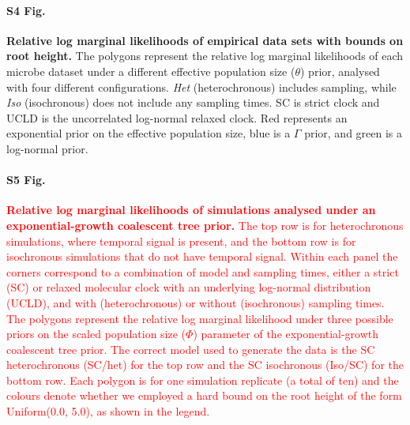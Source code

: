 \documentclass[10pt,letterpaper]{article}
\begin{document}
\paragraph*{S4 Fig.}
\label{S4_Fig}
	\textbf{Relative log marginal likelihoods of empirical data sets with bounds on root height.} The polygons represent the relative log marginal likelihoods of each microbe dataset under a different effective population size ($\theta$) prior, analysed with four different configurations. \textit{Het} (heterochronous) includes sampling, while \textit{Iso} (isochronous) does not include any sampling times. SC is strict clock and UCLD is the uncorrelated log-normal relaxed clock. Red represents an exponential prior on the effective population size, blue is a $\Gamma$ prior, and green is a log-normal prior.

\paragraph*{S5 Fig.}
\label{S5_Fig}
	\textcolor{red}{\textbf{Relative log marginal likelihoods of simulations analysed under an exponential-growth coalescent tree prior.} The top row is for heterochronous simulations, where temporal signal is present, and the bottom row is for isochronous simulations that do not have temporal signal. Within each panel the corners correspond to a combination of model and sampling times, either a strict (SC) or relaxed molecular clock with an underlying log-normal distribution (UCLD), and with (heterochronous) or without (isochronous) sampling times. The polygons represent the relative log marginal likelihood under three possible priors on the scaled population size ($\Phi$) parameter of the exponential-growth coalescent tree prior. The correct model used to generate the data is the SC heterochronous (SC/het) for the top row and the SC isochronous (Iso/SC) for the bottom row. Each polygon is for one simulation replicate (a total of ten) and the colours denote whether we employed a hard bound on the root height of the form Uniform(0.0, 5.0), as shown in the legend.}

\end{document}

